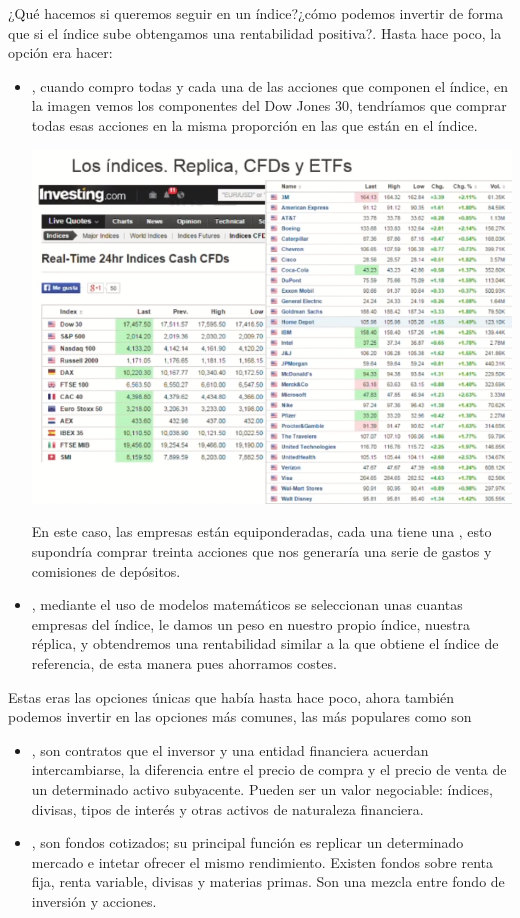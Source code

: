 ¿Qué hacemos si queremos seguir en un índice?¿cómo podemos invertir de forma que si el índice sube obtengamos una rentabilidad positiva?. Hasta hace poco, la opción era hacer:
\begin{itemize}
    \item {}, cuando compro todas y cada una de las acciones que componen el índice, en la imagen vemos los componentes del Dow Jones 30, tendríamos que comprar todas esas acciones en la misma proporción en las que están en el índice.
    \begin{center}
        \includegraphics[scale=.65]{images/mod04_01.png}
    \end{center}
    En este caso, las empresas están equiponderadas, cada una tiene una , esto supondría comprar treinta acciones que nos generaría una serie de gastos y comisiones de depósitos. 
    \item {}, mediante el uso de modelos matemáticos se seleccionan unas cuantas empresas del índice, le damos un peso en nuestro propio índice, nuestra réplica, y obtendremos una rentabilidad similar a la que obtiene el índice de referencia, de esta manera pues ahorramos costes.
\end{itemize}

Estas eras las opciones únicas que había hasta hace poco, ahora también podemos invertir en las opciones más comunes, las más populares como son 
\begin{itemize}
    \item {}, son contratos que el inversor y una entidad financiera acuerdan intercambiarse, la diferencia entre el precio de compra y el precio de venta de un determinado activo subyacente. Pueden ser un valor negociable: índices, divisas, tipos de interés y otras activos de naturaleza financiera.
    \item {}, son fondos cotizados; su principal función es replicar un determinado mercado e intetar ofrecer el mismo rendimiento. Existen fondos sobre renta fija, renta variable, divisas y materias primas. Son una mezcla entre fondo de inversión y acciones.
\end{itemize}


